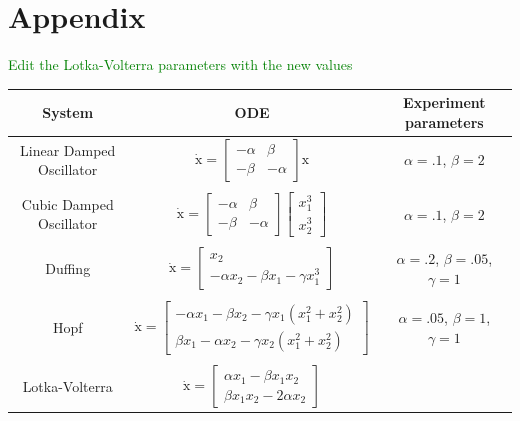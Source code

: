 \documentclass{article}
\newcommand{\green}[1]{\textcolor{green}{#1}}
\renewcommand{\vec}[1]{\boldsymbol{\mathrm{#1}}}
\begin{document}
\section*{Appendix}
\green{Edit the Lotka-Volterra parameters with the new values}
\begin{table}[ht]
    \centering
    \label{tab:ODEs}
    \begin{tabular}{c c c}
        System & ODE & Experiment parameters\\
        \hline\hline
        Linear Damped Oscillator
            & $\dot {\vec x} = \left[\begin{matrix}-\alpha & \beta \\ -\beta & -\alpha\end{matrix}\right] \vec x$
            & $\alpha = .1$, $\beta=2 $\\\\
        Cubic Damped Oscillator
            & $\dot {\vec x} = \left[\begin{matrix}-\alpha & \beta \\ -\beta & -\alpha\end{matrix}\right] \left[\begin{matrix}x_1^3\\x_2^3\end{matrix}\right]$
            & $\alpha = .1$, $\beta=2 $\\\\
        Duffing
            & $\dot {\vec x} = \left[\begin{matrix}x_2 \\ -\alpha x_2 - \beta x_1 -\gamma x_1^3\end{matrix}\right]$
            & $\alpha = .2$, $\beta=.05 $, $\gamma=1$\\\\
        Hopf
            & $\dot {\vec x} = \left[\begin{matrix}
                -\alpha x_1 -\beta x_2 - \gamma x_1(x_1 ^2 + x_2^2) \\
                \beta x_1 - \alpha x_2 -\gamma x_2(x_1 ^2 + x_2^2)
            \end{matrix}\right]$
            & $\alpha = .05$, $\beta=1 $, $\gamma=1$\\\\
        Lotka-Volterra
            & $\dot {\vec x} = \left[\begin{matrix}
                \alpha x_1 - \beta x_1 x_2 \\
                \beta x_1  x_2 - 2 \alpha x_2
            \end{matrix}\right]$

\end{tabular}
\end{table}
\end{document}
